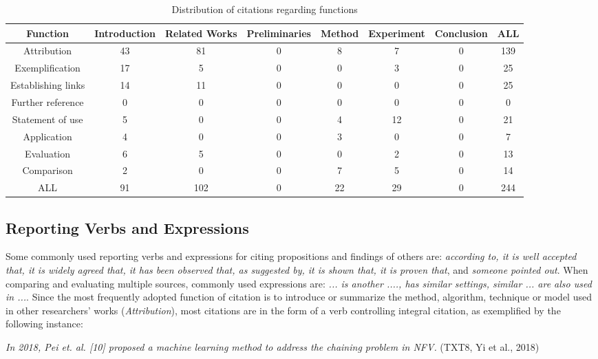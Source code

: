 \begin{table}[thb]
    \caption{Distribution of citations regarding functions}
    \centering
      \begin{tabulary}{\linewidth}{CCCCCCCC}
        \toprule[1.5pt]
        \textbf{Function} & \textbf{Introduction} & \textbf{Related Works} & \textbf{Preliminaries} & \textbf{Method} & \textbf{Experiment} & \textbf{Conclusion} & \textbf{ALL} \\
        \midrule[1pt]
        Attribution & 43 & 81 & 0 & 8 & 7 & 0 & 139\\
        Exemplification & 17 & 5 & 0 & 0 & 3 & 0 & 25\\
        Establishing links & 14 & 11 & 0 & 0 & 0 & 0 & 25\\
        Further reference & 0 & 0 & 0 & 0 & 0 & 0 & 0\\
        Statement of use & 5 & 0 & 0 & 4 & 12 & 0 & 21\\
        Application & 4 & 0 & 0 & 3 & 0 & 0 & 7\\
        Evaluation & 6 & 5 & 0 & 0 & 2 & 0 & 13\\
        Comparison & 2 & 0 & 0 & 7 & 5 & 0 & 14\\
        ALL & 91 & 102 & 0 & 22 & 29 & 0 & 244 \\
      \bottomrule[1.5pt]
    \end{tabulary}
    \label{tab:citation_function}
\end{table}

\subsection{Reporting Verbs and Expressions}
Some commonly used reporting verbs and expressions for citing propositions and findings of others are: \textit{according to, it is well accepted that, it is widely agreed that, it has been observed that, as suggested by, it is shown that, it is proven that}, and \textit{someone pointed out}. When comparing and evaluating multiple sources, commonly used expressions are: \textit{... is another ...., has similar settings, similar ... are also used in ...}. Since the most frequently adopted function of citation is to introduce or summarize the method, algorithm, technique or model used in other researchers’ works (\textit{Attribution}), most citations are in the form of a verb controlling integral citation, as exemplified by the following instance:

\textit{In 2018, Pei et. al. [10] proposed a machine learning method to address the chaining problem in NFV.} (TXT8, Yi et al., 2018)

